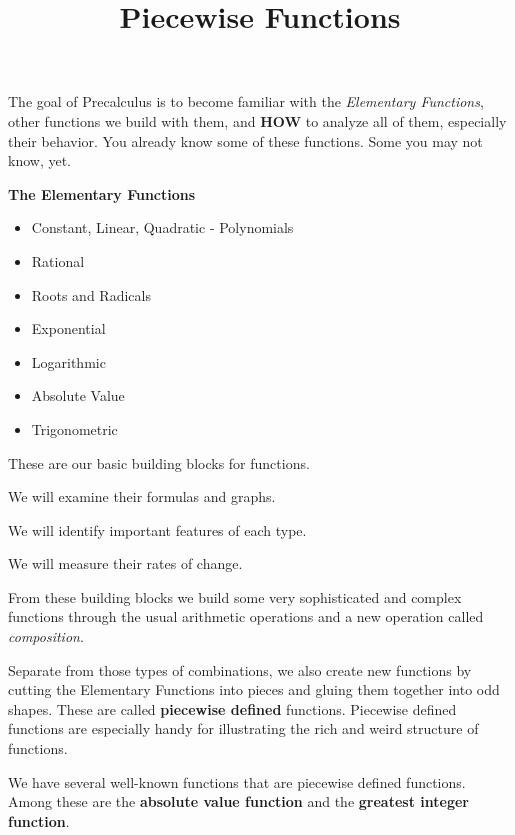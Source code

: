 \documentclass{ximera}
\title{Piecewise Functions}
\begin{document}
\begin{abstract}
\end{abstract}
\maketitle



The goal of Precalculus is to become familiar with the \textit{Elementary Functions}, other functions we build with them, and \textbf{\textcolor{blue!55!black}{HOW}} to analyze all of them, especially their behavior. You already know some of these functions. Some you may not know, yet.






\begin{summary} \textbf{\textcolor{red!70!yellow}{The Elementary Functions}}  
	\begin{itemize}
		\item Constant, Linear, Quadratic - Polynomials
		\item Rational
		\item Roots and Radicals
		\item Exponential
		\item Logarithmic
		\item Absolute Value
		\item Trigonometric
	\end{itemize}
\end{summary}




These are our basic building blocks for functions.  

We will examine their formulas and graphs.  

We will identify important features of each type. 

We will measure their rates of change. 

From these building blocks we build some very sophisticated and complex functions through the usual arithmetic operations and a new operation called \textit{composition}. 

Separate from those types of combinations, we also create new functions by cutting the Elementary Functions into pieces and gluing them together into odd shapes.   These are called \textbf{piecewise defined} functions.  Piecewise defined functions are especially handy for illustrating the rich and weird structure of functions.


We have several well-known functions that are piecewise defined functions. Among these are the \textbf{absolute value function} and the \textbf{greatest integer function}.
\end{document}
